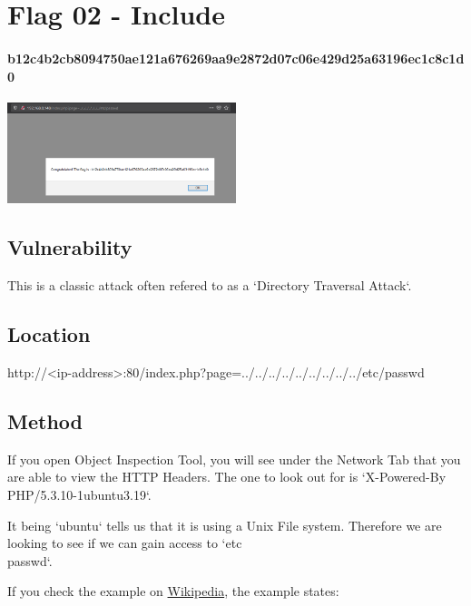 \section{Flag 02 - Include}

\paragraph{b12c4b2cb8094750ae121a676269aa9e2872d07c06e429d25a63196ec1c8c1d0}

\begin{center}
    \includegraphics[width=0.5\textwidth]{05.Flag02/02-07.png}\\[0cm] 
\end{center}

\subsection{Vulnerability}

This is a classic attack often refered to as a `Directory Traversal Attack`.

\subsection{Location}

http://<ip-address>:80/index.php?page=../../../../../../../../../etc/passwd

\subsection{Method}

If you open Object Inspection Tool, you will see under the Network Tab that you are able to view the HTTP Headers. The one to look out for is `X-Powered-By PHP/5.3.10-1ubuntu3.19`.

It being `ubuntu` tells us that it is using a Unix File system. Therefore we are looking to see if we can gain access to `etc\\passwd`.

If you check the example on \href{https://en.wikipedia.org/wiki/Directory\_traversal\_attack}{Wikipedia}, the example states:

